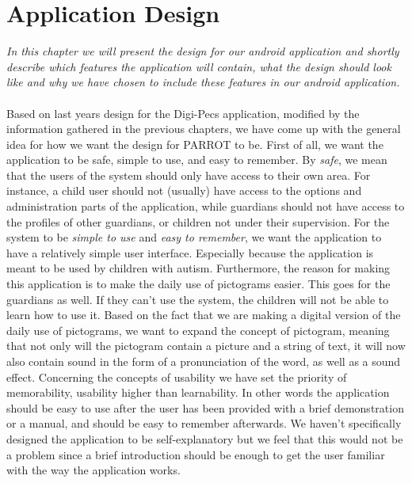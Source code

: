 \chapter{Application Design}
\textit{In this chapter we will present the design for our android application and shortly describe which features the application will contain, what the design should look like and why we have chosen to include these features in our android application.}\\
\label{appdes}
\\
Based on last years design for the Digi-Pecs application, modified by the information gathered in the previous chapters, we have come up with the general idea for how we want the design for PARROT to be.\newline
First of all, we want the application to be safe, simple to use, and easy to remember.\newline
By \textit{safe}, we mean that the users of the system should only have access to their own area. For instance, a child user should not (usually) have access to the options and administration parts of the application, while guardians should not have access to the profiles of other guardians, or children not under their supervision.\newline
For the system to be \textit{simple to use} and \textit{easy to remember}, we want the application to have a relatively simple user interface. Especially because the application is meant to be used by children with autism. Furthermore, the reason for making this application is to make the daily use of pictograms easier. This goes for the guardians as well. If they can't use the system, the children will not be able to learn how to use it.\newline
Based on the fact that we are making a digital version of the daily use of pictograms, we want to expand the concept of pictogram, meaning that not only will the pictogram contain a picture and a string of text, it will now also contain sound in the form of a pronunciation of the word, as well as a sound effect.
Concerning the concepts of usability we have set the priority of memorability, usability higher than learnability. In other words the application should be easy to use after the user has been provided with a brief demonstration or a manual, and should be easy to remember afterwards. We haven't specifically designed the application to be self-explanatory but we feel that this would not be a problem since a brief introduction should be enough to get the user familiar with the way the application works.    

